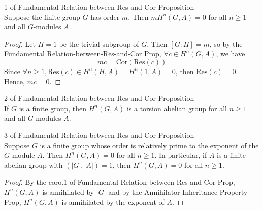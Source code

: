 \begin{corollary}{1 of Fundamental Relation-between-Res-and-Cor Proposition}\\
Suppose the finite group $G$ has order $m$. Then $mH^n(G,A)=0$ for all $n\geq 1$ and all $G$-modules $A$.
\end{corollary}

\begin{proof}
    Let $H=1$ be the trivial subgroup of $G$. Then $[G:H]=m$, so by the Fundamental Relation-between-Res-and-Cor Prop, $\forall c\in H^n(G,A)$, we have
    \[
    mc=\text{Cor} (\text{Res} (c))
    \]
    Since $\forall n\geq1, \text{Res} (c)\in H^n(H,A)= H^n(1,A)=0$, then $\text{Res} (c)=0$. Hence, $mc=0$.
\end{proof}

\begin{corollary}{2 of Fundamental Relation-between-Res-and-Cor Proposition}\\
If $G$ is a finite group, then $H^n(G,A)$ is a torsion abelian group for all $n\geq 1$ and all $G$-modules $A$.
\end{corollary}

\begin{corollary}{3 of Fundamental Relation-between-Res-and-Cor Proposition}\\
Suppose $G$ is a finite group whose order is relatively prime to the exponent of the $G$-module $A$. Then $H^n(G,A)=0$ for all $n\geq1$. In particular, if $A$ is a finite abelian group with $(|G|,|A|)=1$, then $H^n(G,A)=0$ for all $n\geq 1$.
\end{corollary}

\begin{proof}
    By the coro.1 of Fundamental Relation-between-Res-and-Cor Prop, $H^n(G,A)$ is annihilated by $|G|$ and by the Annihilator Inheritance Property Prop, $H^n(G,A)$ is annihilated by the exponent of $A$.
\end{proof}